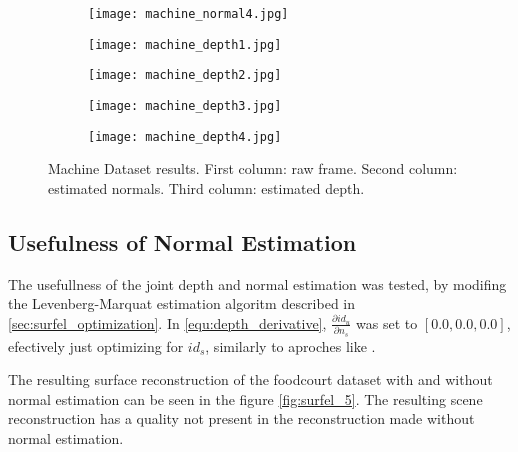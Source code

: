 \documentclass[1p]{elsarticle}
\begin{document}
\begin{figure}[h]
\begin{subfigure}[b]{0.24\textwidth}
         \centering
         \texttt{[image: machine\_normal4.jpg]}
     \end{subfigure}
     \begin{subfigure}[b]{0.24\textwidth}
         \centering
         \texttt{[image: machine\_depth1.jpg]}
     \end{subfigure}
     \begin{subfigure}[b]{0.24\textwidth}
         \centering
         \texttt{[image: machine\_depth2.jpg]}
     \end{subfigure}
     \begin{subfigure}[b]{0.24\textwidth}
         \centering
         \texttt{[image: machine\_depth3.jpg]}
     \end{subfigure}
     \begin{subfigure}[b]{0.24\textwidth}
         \centering
         \texttt{[image: machine\_depth4.jpg]}
     \end{subfigure}
     \caption{Machine Dataset results. First column: raw frame. Second column: estimated normals. Third column: estimated depth.}
             \label{fig:machine_dataset}
\end{figure}

\subsection{Usefulness of Normal Estimation}

The usefullness of the joint depth and normal estimation was tested, by modifing the Levenberg-Marquat estimation algoritm described in \ref{sec:surfel_optimization}. In \ref{equ:depth_derivative}, $\frac{\partial id_{u}}{\partial n_{s}}$ was set to $[0.0,0.0,0.0]$, efectively just optimizing for $id_{s}$, similarly to aproches like \cite{Engel-et-al-pami2018}.

The resulting surface reconstruction of the foodcourt dataset with and without normal estimation can be seen in the figure \ref{fig:surfel_5}. The resulting scene reconstruction has a quality not present in the reconstruction made without normal estimation. 
\end{document}

